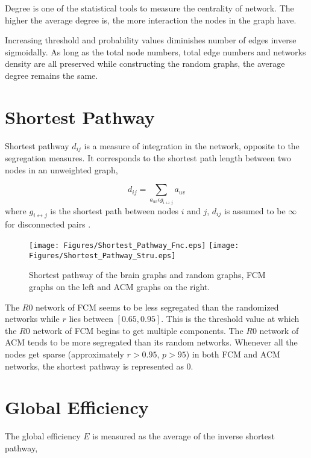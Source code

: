 Degree is one of the statistical tools to measure the centrality of network. The higher the average degree is, the more interaction the nodes in the graph have. 

Increasing threshold and probability values diminishes number of edges inverse sigmoidally. As long as the total node numbers, total edge numbers and networks density are all preserved while constructing the random graphs, the average degree remains the same. 

\section{Shortest Pathway}
Shortest pathway $d_{ij}$ is a measure of integration in the network, opposite to the segregation measures. It corresponds to the shortest path length between two nodes in an unweighted graph,  

\begin{equation}
d_{ij} = \sum\limits_{a_{uv} \epsilon g_{i\leftrightarrow j} } a_{uv}
\end{equation}
where $g_{i\leftrightarrow j}$ is the shortest path between nodes $i$ and $j$, $d_{ij}$ is assumed to be $\infty$ for disconnected pairs \citep{RUB10}.


\begin{figure}[htbp]
 
  \centering
	 \texttt{[image: Figures/Shortest\_Pathway\_Fnc.eps]}
	 \texttt{[image: Figures/Shortest\_Pathway\_Stru.eps]}
  \caption[Shortest Pathway]{Shortest pathway of the brain graphs and random graphs, FCM graphs on the left and ACM graphs on the right.} 
    \label{fig:Shortest Pathway}
 	
\end{figure}  


The $R0$ network of FCM seems to be less segregated than the randomized networks while $r$ lies between $[0.65,0.95]$. This is the threshold value at which the $R0$ network of FCM begins to get multiple components. The $R0$ network of ACM tends to be more segregated than its random networks. Whenever all the nodes get sparse (approximately $r>0.95$, $p>95$) in both FCM and ACM networks, the shortest pathway is represented as 0. 




\section{Global Efficiency}
The global efficiency $E$ is measured as the average of the inverse shortest pathway,

